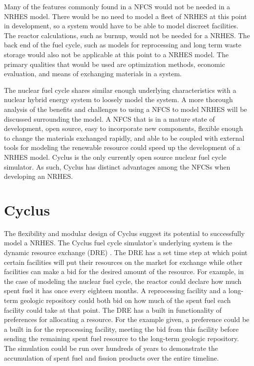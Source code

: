\documentclass[12pt]{UIdahoMastersThesis}
\begin{document}
Many of the features commonly found in a NFCS would not be needed in a NRHES model.  There would be no need to model a fleet of NRHES at this point in development, so a system would have to be able to model discreet facilities.  The reactor calculations, such as burnup, would not be needed for a NRHES.  The back end of the fuel cycle, such as models for reprocessing and long term waste storage would also not be applicable at this point to a NRHES model.  The primary qualities that would be used are optimization methods, economic evaluation, and means of exchanging materials in a system. 

The nuclear fuel cycle shares similar enough underlying characteristics with a nuclear hybrid energy system to loosely model the system.  A more thorough analysis of the benefits and challenges to using a NFCS to model NRHES will be discussed surrounding the model. A NFCS that is in a mature state of development, open source, easy to incorporate new components, flexible enough to change the materials exchanged rapidly, and able to be coupled with external tools for modeling the renewable resource could speed up the development of a NRHES model. Cyclus is the only currently open source nuclear fuel cycle simulator.  As such, Cyclus has distinct advantages among the NFCSs when developing an NRHES.

\section{Cyclus}

The flexibility and modular design of Cyclus suggest its potential to successfully model a NRHES. The Cyclus fuel cycle simulator's underlying system is the dynamic resource exchange (DRE) \cite{Huff2016}.  The DRE has a set time step at which point certain facilities will put their resources on the market for exchange while other facilities can make a bid for the desired amount of the resource. For example, in the case of modeling the nuclear fuel cycle, the reactor could declare how much spent fuel it has once every eighteen months.  A reprocessing facility and a long-term geologic repository could both bid on how much of the spent fuel each facility could take at that point.  The DRE has a built in functionality of preferences for allocating a resource.  For the example given, a preference could be a built in for the reprocessing facility, meeting the bid from this facility before sending the remaining spent fuel resource to the long-term geologic repository. The simulation could be run over hundreds of years to demonstrate the accumulation of spent fuel and fission products over the entire timeline. 
\end{document}
